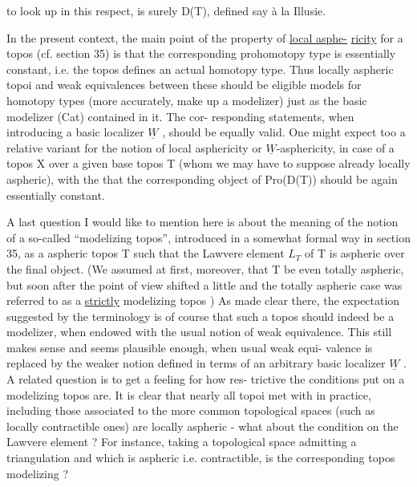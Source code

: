 to look up in this respect,  is surely D(T),  defined say à la Illusie.

In the present context,  the main point of the property of \uline{local asphe-}%
\uline{ricity} for a topos (cf.  section 35)  is that the corresponding prohomotopy
type is essentially constant,  i.e. the topos defines an actual homotopy
type.  Thus locally aspheric topoi  and weak equivalences between these
should be eligible models for homotopy types  (more accurately,  make up
a modelizer)\hand{,} just as the basic modelizer (Cat) contained in it.  The cor-%
responding statements,  when introducing a basic localizer  $\underline{W}$ ,  should be
equally valid.  One might expect too a relative variant for the notion of
local asphericity or $\underline{W}$-asphericity,  in case of a topos X over a given
base topos T (whom we may have to suppose already locally aspheric),  with
the  that the corresponding object of Pro(D(T)) should be again
essentially constant.

A last question I would like to mention here is about the meaning of
the notion of a so-called ``modelizing topos'',  introduced in a somewhat
formal way in section 35,  as a  aspheric  topos T such that the
Lawvere element $L_T$ of T is aspheric over the final object. (We assumed at
first,  moreover,  that T be even totally aspheric,  but soon after the
point of view  shifted a little and the totally aspheric case was referred 
to as a \uline{strictly} modelizing topos\hand{,} )  As made clear there,  the expectation
suggested by the terminology is of course that such a topos should indeed
be a modelizer,  when endowed with the usual notion of weak equivalence.
This still makes sense and seems plausible enough,  when usual weak equi-%
valence is replaced by the weaker notion defined in terms of an arbitrary
basic localizer $\underline{W}$ .   A related question is to get a feeling for how res-%
trictive the conditions put on a modelizing topos  are.  It is clear
that nearly all topoi met with in practice,  including those associated to
the more common topological spaces (such as locally contractible ones) are
locally aspheric  -  what about the condition on the Lawvere element ?
For instance, taking a topological space admitting a  triangulation and
which is aspheric i.e. contractible,  is the corresponding topos 
modelizing ?

